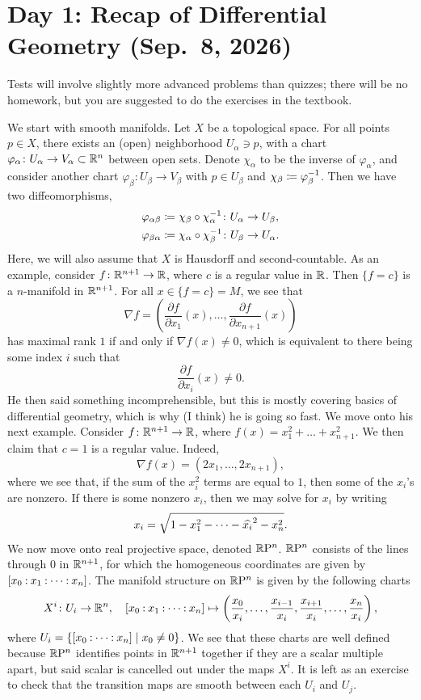 \section{Day 1: Recap of Differential Geometry (Sep.\ 8, 2026)}
Tests will involve slightly more advanced problems than quizzes; there will be no homework, but you are suggested to do the exercises in the textbook.

We start with smooth manifolds. Let $X$ be a topological space. For all points $p \in X$, there exists an (open) neighborhood $U_\alpha \ni p$, with a chart $\varphi_\alpha \colon U_\alpha \to V_\alpha \subset \mathbb R^n$ between open sets. Denote $\chi_\alpha$ to be the inverse of $\varphi_\alpha$, and consider another chart $\varphi_\beta \colon U_\beta \to V_\beta$ with $p \in U_\beta$ and $\chi_\beta \coloneq \varphi_\beta^{-1}$. Then we have two diffeomorphisms,
\begin{align*}
    \varphi_{\alpha \beta} &\coloneq \chi_\beta \circ \chi_\alpha^{-1} \colon U_\alpha \to U_\beta, \\
    \varphi_{\beta \alpha} &\coloneq \chi_\alpha \circ \chi_\beta^{-1} \colon U_\beta \to U_\alpha.
\end{align*}
Here, we will also assume that $X$ is Hausdorff and second-countable. As an example, consider $f \colon \mathbb R^{n+1} \to \mathbb R$, where $c$ is a regular value in $\mathbb R$. Then $\{f = c\}$ is a $n$-manifold in $\mathbb R^{n+1}$. For all $x \in \{f = c\} = M$, we see that
\[ \nabla f = \left(\frac{\partial f}{\partial x_1} (x), \dots, \frac{\partial f}{\partial x_{n+1}} (x)\right) \]
has maximal rank $1$ if and only if $\nabla f(x) \neq 0$, which is equivalent to there being some index $i$ such that
\[ \frac{\partial f}{\partial x_i}(x) \neq 0. \]
He then said something incomprehensible, but this is mostly covering basics of differential geometry, which is why (I think) he is going so fast. We move onto his next example. Consider $f \colon \mathbb R^{n+1} \to \mathbb R$, where $f(x) = x_1^2 + \dots + x_{n+1}^2$. We then claim that $c = 1$ is a regular value. Indeed,
\[ \nabla f(x) = (2x_1, \dots, 2x_{n+1}), \]
where we see that, if the sum of the $x_i^2$ terms are equal to $1$, then some of the $x_i$'s are nonzero. If there is some nonzero $x_i$, then we may solve for $x_i$ by writing
\[ x_i = \sqrt{1 - x_1^2 - \dots - \widehat{x_i}^2 - x_n^2}. \]
We now move onto real projective space, denoted $\mathbb{R}\mathrm{P}^n$. $\mathbb{R}\mathrm{P}^n$ consists of the lines through $0$ in $\mathbb R^{n+1}$, for which the homogeneous coordinates are given by $\coor{x_0 : x_1 : \dots : x_n}$. The manifold structure on $\mathbb{R}\mathrm{P}^n$ is given by the following charts
\[ X^i \colon U_i \to \RR^n, \quad \coor{x_0 : x_1 : \dots : x_n} \mapsto \left(\frac{x_0}{x_i}, \dots, \frac{x_{i-1}}{x_i}, \frac{x_{i+1}}{x_i}, \dots, \frac{x_n}{x_i}\right), \]
where $U_i = \{\coor{x_0 : \dots : x_n} \mid x_0 \neq 0\}$. We see that these charts are well defined because $\mathbb{R}\mathrm{P}^n$ identifies points in $\mathbb R^{n+1}$ together if they are a scalar multiple apart, but said scalar is cancelled out under the maps $X^i$. It is left as an exercise to check that the transition maps are smooth between each $U_i$ and $U_j$.


